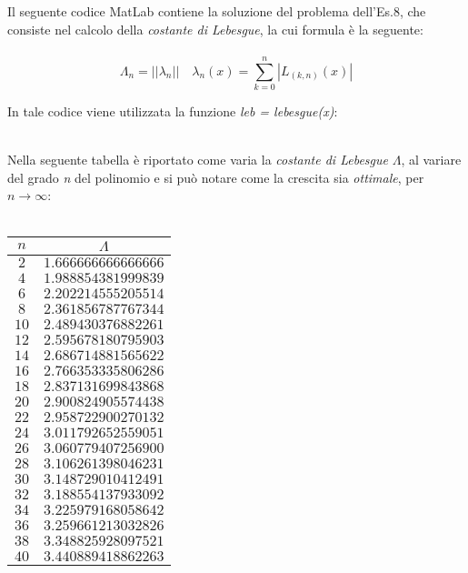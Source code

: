 Il seguente codice MatLab contiene la soluzione del problema dell'Es.8, che consiste nel calcolo della \textit{costante di Lebesgue}, la cui formula è la seguente:\\\
	\[
		\Lambda_n = ||\lambda_n|| \quad \lambda_n(x) = \sum_{k=0}^{n} |L_{(k,n)}(x)|
	\]
	
In tale codice viene utilizzata la funzione \textit{leb = lebesgue(x)}:\\\
	
Nella seguente tabella è riportato come varia la \textit{costante di Lebesgue} $\Lambda$, al variare del grado \textit{n} del polinomio e si può notare come la crescita sia \textit{ottimale}, per $n\rightarrow\infty$:\\\
	\begin{center}
		\begin{tabular}{|c|c|}
			\hline
				$n$ & $\Lambda$ \\
    		\hline
    			$2$  & $1.666666666666666$ \\ 
    			$4$  & $1.988854381999839$ \\ 
    			$6$  & $2.202214555205514$ \\ 
    			$8$  & $2.361856787767344$ \\ 
    			$10$ & $2.489430376882261$ \\ 
    			$12$ & $2.595678180795903$ \\ 
    			$14$ & $2.686714881565622$ \\ 
    			$16$ & $2.766353335806286$ \\ 
   				$18$ & $2.837131699843868$ \\ 
    			$20$ & $2.900824905574438$ \\ 
    			$22$ & $2.958722900270132$ \\ 
    			$24$ & $3.011792652559051$ \\ 
    			$26$ & $3.060779407256900$ \\ 
    			$28$ & $3.106261398046231$ \\ 
    			$30$ & $3.148729010412491$ \\ 
    			$32$ & $3.188554137933092$ \\ 
    			$34$ & $3.225979168058642$ \\ 
    			$36$ & $3.259661213032826$ \\ 
    			$38$ & $3.348825928097521$ \\ 
    			$40$ & $3.440889418862263$ \\ 
			\hline
		\end{tabular}
	\end{center}
